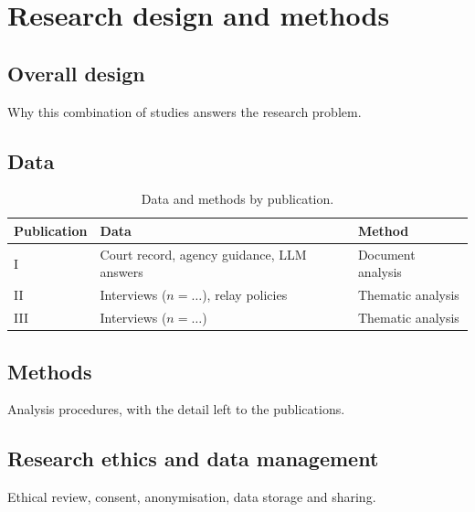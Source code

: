 \chapter{Research design and methods}\label{ch:design}

\section{Overall design}

Why this combination of studies answers the research problem.

\section{Data}

\begin{table}[htbp]
  \centering
  \caption{Data and methods by publication.}\label{tab:data}
  \begin{tabular}{lll}
    \toprule
    Publication & Data & Method \\
    \midrule
    I   & Court record, agency guidance, LLM answers & Document analysis \\
    II  & Interviews ($n=\ldots$), relay policies     & Thematic analysis \\
    III & Interviews ($n=\ldots$)                     & Thematic analysis \\
    \bottomrule
  \end{tabular}
\end{table}

\section{Methods}

Analysis procedures, with the detail left to the publications.

\section{Research ethics and data management}

Ethical review, consent, anonymisation, data storage and sharing.
